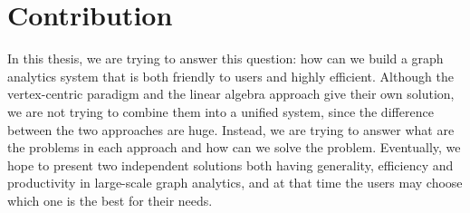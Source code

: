 \documentclass{sokendai_thesis} %
\begin{document}
\section{Contribution}

In this thesis, we are trying to answer this question: how can we build a graph analytics system that is both friendly to users and highly efficient.
Although the vertex-centric paradigm and the linear algebra approach give their own solution, we are not trying to combine them into a unified system, since the difference between the two approaches are huge.
Instead, we are trying to answer what are the problems in each approach and how can we solve the problem.
Eventually, we hope to present two independent solutions both having generality, efficiency and productivity in large-scale graph analytics, and at that time the users may choose which one is the best for their needs.





\end{document}
